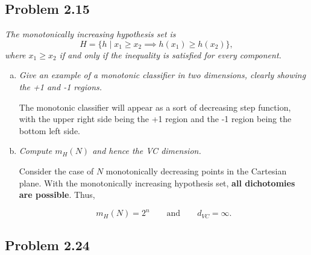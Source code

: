 \documentclass{article}
\begin{document}
\subsection*{Problem 2.15}

\textit{The monotonically increasing hypothesis set is
$$H = \{h \mid x_1 \geq x_2 \implies h(x_1) \geq h(x_2)\},$$ where $x_1\geq x_2$ if and only if
the inequality is satisfied for every component.}

\begin{enumerate}[(a)]
  \item \textit{Give an example of a monotonic classifier in two dimensions, clearly showing
    the +1 and -1 regions.}

    The monotonic classifier will appear as a sort of decreasing step function, with the upper
    right side being the +1 region and the -1 region being the bottom left side.

    \begin{center}
    \end{center}

  \item \textit{Compute $m_H(N)$ and hence the VC dimension.}

    Consider the case of $N$ monotonically decreasing points in the Cartesian plane. With the
    monotonically increasing hypothesis set, \textbf{all dichotomies are possible}. Thus,

    $$m_H(N) = 2^n \qquad \text{and} \qquad d_{VC} = \infty.$$

\end{enumerate}



\subsection*{Problem 2.24}
\end{document}
